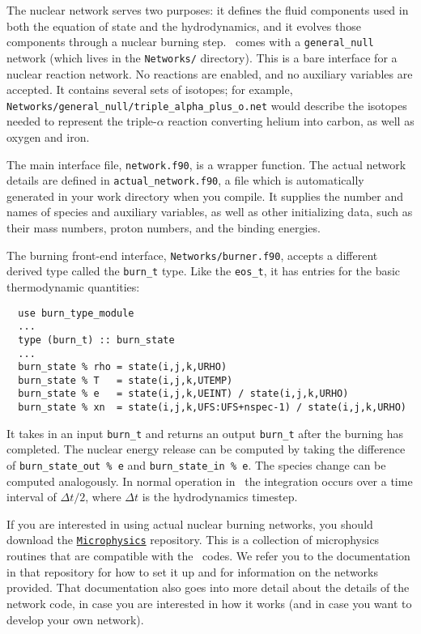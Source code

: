 The nuclear network serves two purposes: it defines the fluid components used
in both the equation of state and the hydrodynamics, and it evolves those
components through a nuclear burning step. \castro\ comes with a {\tt general\_null}
network (which lives in the {\tt Networks/} directory). This is a bare interface for a
nuclear reaction network. No reactions are enabled, and no auxiliary variables
are accepted. It contains several sets of isotopes; for example,
{\tt Networks/general\_null/triple\_alpha\_plus\_o.net} would describe the
isotopes needed to represent the triple-$\alpha$ reaction converting
helium into carbon, as well as oxygen and iron.

The main interface file, {\tt network.f90}, is a wrapper function. The
actual network details are defined in {\tt actual\_network.f90}, a 
file which is automatically generated in your work directory when you compile.
It supplies the number and names of species and auxiliary variables, as
well as other initializing data, such as their mass numbers, proton numbers, 
and the binding energies.

The burning front-end interface, {\tt Networks/burner.f90}, accepts a different 
derived type called the {\tt burn\_t} type. Like the {\tt eos\_t}, it has entries 
for the basic thermodynamic quantities:
\begin{verbatim}
  use burn_type_module
  ...
  type (burn_t) :: burn_state
  ...
  burn_state % rho = state(i,j,k,URHO)
  burn_state % T   = state(i,j,k,UTEMP)
  burn_state % e   = state(i,j,k,UEINT) / state(i,j,k,URHO)
  burn_state % xn  = state(i,j,k,UFS:UFS+nspec-1) / state(i,j,k,URHO)
\end{verbatim}
It takes in an input {\tt burn\_t} and returns an output {\tt burn\_t} after 
the burning has completed. The nuclear energy release can be computed by 
taking the difference of {\tt burn\_state\_out \% e} and 
{\tt burn\_state\_in \% e}. The species change can be computed analogously. 
In normal operation in \castro\, the integration occurs over a time interval 
of $\Delta t/2$, where $\Delta t$ is the hydrodynamics timestep.

If you are interested in using actual nuclear burning networks,
you should download the \href{https://github.com/BoxLib-Codes/Microphysics}{\tt Microphysics}
repository. This is a collection of microphysics routines that are compatible with the
\boxlib\ codes. We refer you to the documentation in that repository for how to set it up
and for information on the networks provided. That documentation
also goes into more detail about the details of the network code, in case you are interested in
how it works (and in case you want to develop your own network).

